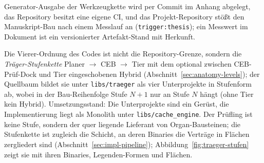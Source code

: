 \begin{nurkurz}
\begin{itemize}
  Generator-Ausgabe der Werkzeugkette wird per Commit im Anhang abgelegt, das Repository besitzt eine
  eigene CI, und das Projekt-Repository stößt den Manuskript-Bau nach einem Messlauf an
  (\texttt{trigger:thesis}); ein Messwert im Dokument ist ein versionierter Artefakt-Stand mit Herkunft.
\end{itemize}
Die Vierer-Ordnung des Codes ist nicht die Repository-Grenze, sondern die \emph{Träger-Stufenkette}
Planer $\to$ CEB $\to$ Tier mit dem optional zwischen CEB-Prüf-Dock und Tier eingeschobenen Hybrid
(Abschnitt~\ref{sec:anatomy-levels}); der Quellbaum bildet sie unter \texttt{libs/traeger} als vier
Unterprojekte in Stufenform ab, wobei in der Bau-Reihenfolge Stufe $N+1$ nur an Stufe $N$
hängt (ohne Tier kein Hybrid). Umsetzungsstand: Die Unterprojekte sind ein Gerüst, die Implementierung liegt als Monolith unter
\texttt{libs/\allowbreak{}cache\_\allowbreak{}engine}. Der Prüfling ist keine Stufe, sondern der quer
liegende Lieferant von Organ-Bausteinen; die Stufenkette ist zugleich die Schicht, an deren Binaries die
Verträge in Flächen zergliedert sind (Abschnitt~\ref{sec:impl-pipeline}); Abbildung~\ref{fig:traeger-stufen}
zeigt sie mit ihren Binaries, Legenden-Formen und Flächen.
\begin{figure}[htbp]\centering
\end{figure}
\end{nurkurz}
